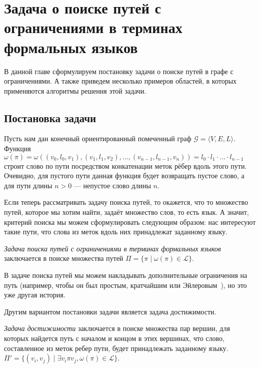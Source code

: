 \section{Задача о поиске путей с ограничениями в терминах формальных языков}



В данной главе сформулируем постановку задачи о поиске путей в графе с ограничениями. 
А также приведем несколько примеров областей, в которых применяются алгоритмы решения этой задачи.

\subsection{Постановка задачи }


Пусть нам дан конечный ориентированный помеченный граф $\mathcal{G}=\langle V,E,L \rangle$.
Функция $\omega(\pi) = \omega((v_0, l_0, v_1),(v_1,l_1,v_2),\dots,(v_{n-1},l_{n-1},v_n)) = l_0 \cdot l_1 \cdot \ldots \cdot l_{n-1} $ строит слово по пути посредством конкатенации меток рёбер вдоль этого пути.
Очевидно, для пустого пути данная функция будет возвращать пустое слово, а для пути длины $n  > 0$ --- непустое слово длины $n$.

Если теперь рассматривать задачу поиска путей, то окажется, что то множество путей, которое мы хотим найти, задаёт множество слов, то есть язык.
А значит, критерий поиска мы можем сформулировать следующим образом: нас интересуют такие пути, что слова из меток вдоль них принадлежат заданному языку.
\begin{definition} \label{def1}
	\textit{Задача поиска путей с ограничениями в терминах формальных языков} заключается в поиске множества путей $\Pi = \{\pi \mid \omega(\pi) \in \mathcal{L}\}$.
	
\end{definition}

В задаче поиска путей мы можем накладывать дополнительные ограничения на путь (например, чтобы он был простым, кратчайшим или Эйлеровым~\cite{kupferman2016eulerian}), но это уже другая история.

Другим вариантом постановки задачи является задача достижимости.

\begin{definition} \label{def2}
	\textit{Задача достижимости} заключается в поиске множества пар вершин, для которых найдется путь с началом и концом в этих вершинах, что слово, составленное из меток ребер пути, будет принадлежать заданному языку.
	$\Pi' = \{(v_{i}, v_{j}) \mid \exists v_{i} \pi v_{j}, \omega(\pi) \in \mathcal{L}\}$.
	
\end{definition}

